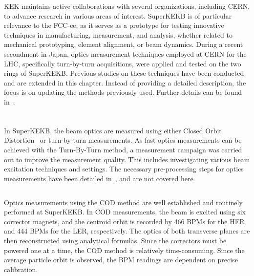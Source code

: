 KEK maintains active collaborations with several organizations, including CERN, to advance research
in various areas of interest. SuperKEKB is of particular relevance to the FCC-ee, as it serves as a
prototype for testing innovative techniques in manufacturing, measurement, and analysis, whether
related to mechanical prototyping, element alignment, or beam dynamics. During a recent secondment
in Japan, optics measurement techniques employed at CERN for the LHC, specifically turn-by-turn
acquisitions, were applied and tested on the two rings of SuperKEKB.
Previous studies on these techniques have been conducted and are extended in this chapter. Instead
of providing a detailed description, the focus is on updating the methods previously used. Further
details can be found
in~\cite{keintzel_jacqueline_beam_2022,keintzel_superkekb_2021,keintzel_impact_2021,thrane_measuring_2020}.



\section{}

In SuperKEKB, the beam optics are measured using either Closed Orbit
Distortion~\cite{ohnishi_optics_1999} or turn-by-turn measurements. As fast optics measurements can
be achieved with the Turn-By-Turn method, a measurement campaign was carried out to improve the
measurement quality. This includes investigating various beam excitation techniques and settings.
The necessary pre-processing steps for optics measurements have been detailed
in~\cite{keintzel_jacqueline_beam_2022}, and are not covered here.


\subsection{}

Optics measurements using the COD method
\cite{harrison_global_1987,chung_measurement_1993,ohnishi_optics_1999} are well established and
routinely performed at SuperKEKB. In COD measurements, the beam is excited using six corrector
magnets, and the centroid orbit is recorded by 466 BPMs for the HER and 444 BPMs for the LER,
respectively. The optics of both transverse planes are then reconstructed using
analytical formulas. Since the correctors must be powered one at a time, the COD method is
relatively time-consuming. 
Since the average particle orbit is observed, the BPM readings are dependent on precise
calibration.


